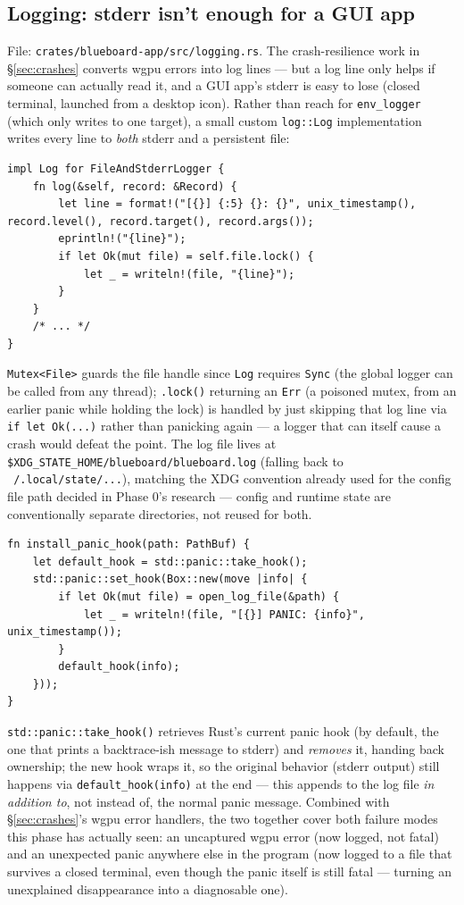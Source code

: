 \documentclass[11pt]{article}
\begin{document}
\subsection{Logging: stderr isn't enough for a GUI app}
File: \texttt{crates/blueboard-app/src/logging.rs}. The crash-resilience work in
\S\ref{sec:crashes} converts wgpu errors into log lines — but a log line only helps if
someone can actually read it, and a GUI app's stderr is easy to lose (closed terminal,
launched from a desktop icon). Rather than reach for \texttt{env\_logger} (which only
writes to one target), a small custom \texttt{log::Log} implementation writes every line
to \emph{both} stderr and a persistent file:
\begin{lstlisting}
impl Log for FileAndStderrLogger {
    fn log(&self, record: &Record) {
        let line = format!("[{}] {:5} {}: {}", unix_timestamp(), record.level(), record.target(), record.args());
        eprintln!("{line}");
        if let Ok(mut file) = self.file.lock() {
            let _ = writeln!(file, "{line}");
        }
    }
    /* ... */
}
\end{lstlisting}
\texttt{Mutex<File>} guards the file handle since \texttt{Log} requires \texttt{Sync} (the
global logger can be called from any thread); \texttt{.lock()} returning an \texttt{Err}
(a poisoned mutex, from an earlier panic while holding the lock) is handled by just
skipping that log line via \texttt{if let Ok(...)} rather than panicking again — a logger
that can itself cause a crash would defeat the point. The log file lives at
\texttt{\$XDG\_STATE\_HOME/blueboard/blueboard.log} (falling back to
\texttt{~/.local/state/...}), matching the XDG convention already used for the config file
path decided in Phase 0's research — config and runtime state are conventionally separate
directories, not reused for both.
\begin{lstlisting}
fn install_panic_hook(path: PathBuf) {
    let default_hook = std::panic::take_hook();
    std::panic::set_hook(Box::new(move |info| {
        if let Ok(mut file) = open_log_file(&path) {
            let _ = writeln!(file, "[{}] PANIC: {info}", unix_timestamp());
        }
        default_hook(info);
    }));
}
\end{lstlisting}
\texttt{std::panic::take\_hook()} retrieves Rust's current panic hook (by default, the one
that prints a backtrace-ish message to stderr) and \emph{removes} it, handing back
ownership; the new hook wraps it, so the original behavior (stderr output) still happens
via \texttt{default\_hook(info)} at the end — this appends to the log file \emph{in
addition to}, not instead of, the normal panic message. Combined with
\S\ref{sec:crashes}'s wgpu error handlers, the two together cover both failure modes this
phase has actually seen: an uncaptured wgpu error (now logged, not fatal) and an
unexpected panic anywhere else in the program (now logged to a file that survives a closed
terminal, even though the panic itself is still fatal — turning an unexplained
disappearance into a diagnosable one).
\end{document}
